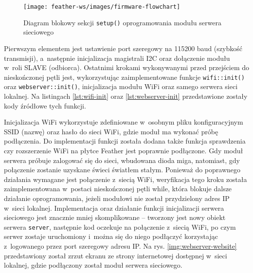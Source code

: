 \begin{figure}[!htbp]
    \centering
    \texttt{[image: feather-ws/images/firmware-flowchart]}
    \caption{\label{img:webserver-firmware}Diagram blokowy sekcji \texttt{setup()} oprogramowania modułu
        serwera sieciowego}
\end{figure}



\FloatBarrier
Pierwszym elementem jest ustawienie port szeregowy na 115200 baud (szybkość transmisji), a~następnie inicjalizacja
magistrali I2C oraz dołączenie modułu w~roli SLAVE (odbiorca). Ostatnimi krokami wykonywanymi przed przejściem do
nieskończonej pętli jest, wykorzystując zaimplementowane funkcje \texttt{wifi::init()} oraz \texttt{webserver::init()},
inicjalizacja modułu WiFi oraz samego serwera sieci lokalnej. Na listingach \ref{lst:wifi-init} oraz
\ref{lst:webserver-init} przedstawione zostały kody źródłowe tych funkcji.





\FloatBarrier
Inicjalizacja WiFi wykorzystuje zdefiniowane w~osobnym pliku konfiguracyjnym SSID (nazwę) oraz hasło do sieci WiFi,
gdzie moduł ma wykonać próbę podłączenia. Do implementacji funkcji została dodana także funkcja sprawdzenia czy
rozszerzenie WiFi na płytce Feather jest poprawnie podłączone. Gdy moduł serwera próbuje zalogować się do sieci,
wbudowana dioda miga, natomiast, gdy połączenie zostanie uzyskane świeci światłem stałym. Ponieważ do poprawnego
działania wymagane jest połączenie z~siecią WiFi, weryfikacja tego kroku została zaimplementowana w~postaci
nieskończonej pętli while, która blokuje dalsze działanie oprogramowania, jeżeli modułowi nie został przydzielony adres
IP w~sieci lokalnej. Implementacja oraz działanie funkcji inicjalizacji serwera sieciowego jest znacznie mniej
skomplikowane -- tworzony jest nowy obiekt serwera \texttt{server}, następnie kod oczekuje na połączenie z~siecią WiFi,
po czym serwer zostaje uruchomiony i~można się do niego podłączyć korzystając z~logowanego przez port szeregowy adresu
IP. Na rys. \ref{img:webserver-website} przedstawiony został zrzut ekranu ze strony internetowej dostępnej w~sieci
lokalnej, gdzie podłączony został moduł serwera sieciowego.

